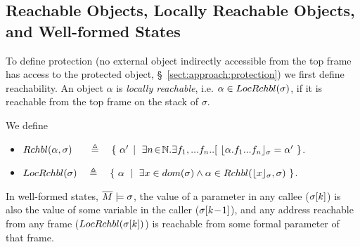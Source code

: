 {\begin{lemma}
\end{lemma}
 






\subsection{Reachable  Objects, Locally Reachable Objects, and Well-formed States}

To define protection (no external object indirectly accessible from the top frame
has access to the protected object, \cf \S~\ref{sect:approach:protection}) we first define
reachability. %
%  
%
An object
$\alpha$ is
 \emph{locally reachable}, i.e. $\alpha \in  LocRchbl(\sigma) $, if it is reachable from the top frame on the stack of $\sigma$.
 
\begin{definition} We define 
\begin{itemize}
\item
{{$\Relevant {\alpha} {\sigma}  \ \ \ \ \ \triangleq \ \  \  \{ \ \alpha' \, \mid \ \exists n\!\in\!\mathbb{N}.\exists f_1,...f_n.. [\ \interpret {\sigma} {\alpha.f_1...f_n} = \alpha'\ \}$}}.
\item
$ \LRelevantO   \sigma  \ \  \ \triangleq \ \  \  \{ \ \alpha \ \mid \ { \exists x\in dom(\sigma) \wedge \alpha \in \Relevant {\interpret  {\sigma} x}
{\sigma} \ \} } $.
\end{itemize}
\end{definition}


 
In well-formed states, $\overline{M} \models \sigma$,    the value of a parameter in  any callee   (${\sigma[k]}$) is also the %
 value of some variable in the caller (${\sigma[k\!-\!1]}$),
and any address reachable from any frame (${LocRchbl(\sigma[k]) }$) is reachable from some formal parameter of that frame. 
 


}

